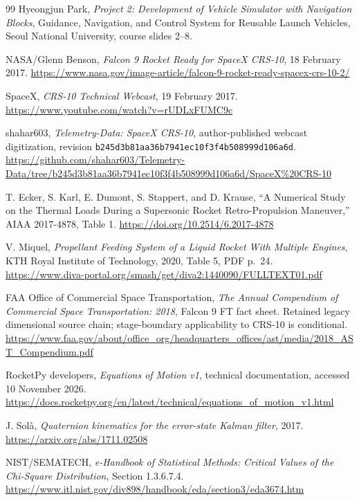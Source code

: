 \begin{thebibliography}{99}
Hyeongjun Park, \emph{Project 2: Development of Vehicle Simulator with Navigation Blocks}, Guidance, Navigation, and Control System for Reusable Launch Vehicles, Seoul National University, course slides 2--8.

NASA/Glenn Benson, \emph{Falcon 9 Rocket Ready for SpaceX CRS-10}, 18 February 2017.
\url{https://www.nasa.gov/image-article/falcon-9-rocket-ready-spacex-crs-10-2/}

SpaceX, \emph{CRS-10 Technical Webcast}, 19 February 2017.
\url{https://www.youtube.com/watch?v=rUDLxFUMC9c}

shahar603, \emph{Telemetry-Data: SpaceX CRS-10}, author-published webcast digitization, revision \texttt{b245d3b81aa36b7941ec10f3f4b508999d106a6d}.
\url{https://github.com/shahar603/Telemetry-Data/tree/b245d3b81aa36b7941ec10f3f4b508999d106a6d/SpaceX%20CRS-10}

T. Ecker, S. Karl, E. Dumont, S. Stappert, and D. Krause, ``A Numerical Study on the Thermal Loads During a Supersonic Rocket Retro-Propulsion Maneuver,'' AIAA 2017-4878, Table 1.
\url{https://doi.org/10.2514/6.2017-4878}

V. Miquel, \emph{Propellant Feeding System of a Liquid Rocket With Multiple Engines}, KTH Royal Institute of Technology, 2020, Table 5, PDF p.~24.
\url{https://www.diva-portal.org/smash/get/diva2:1440090/FULLTEXT01.pdf}

FAA Office of Commercial Space Transportation, \emph{The Annual Compendium of Commercial Space Transportation: 2018}, Falcon 9 FT fact sheet. Retained legacy dimensional source chain; stage-boundary applicability to CRS-10 is conditional.
\url{https://www.faa.gov/about/office_org/headquarters_offices/ast/media/2018_AST_Compendium.pdf}

RocketPy developers, \emph{Equations of Motion v1}, technical documentation, accessed 10 November 2026.
\url{https://docs.rocketpy.org/en/latest/technical/equations_of_motion_v1.html}

J. Sol\`a, \emph{Quaternion kinematics for the error-state Kalman filter}, 2017.
\url{https://arxiv.org/abs/1711.02508}

NIST/SEMATECH, \emph{e-Handbook of Statistical Methods: Critical Values of the Chi-Square Distribution}, Section 1.3.6.7.4.
\url{https://www.itl.nist.gov/div898/handbook/eda/section3/eda3674.htm}

\end{thebibliography}
